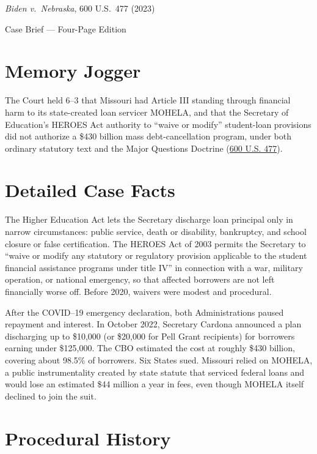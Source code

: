 \documentclass[12pt]{article}
\begin{document}
\begin{center}
{\LARGE \textit{Biden v.\ Nebraska}, 600 U.S.\ 477 (2023)\par}
\vspace{0.8em}
{\large Case Brief --- Four-Page Edition\par}
\end{center}
\vspace{1em}

\section{Memory Jogger}

The Court held 6--3 that Missouri had Article III standing through financial harm to its state-created loan servicer MOHELA, and that the Secretary of Education's HEROES Act authority to ``waive or modify'' student-loan provisions did not authorize a \$430 billion mass debt-cancellation program, under both ordinary statutory text and the Major Questions Doctrine (\href{https://www.law.cornell.edu/supremecourt/text/22-506}{600 U.S. 477}).

\section{Detailed Case Facts}

The Higher Education Act lets the Secretary discharge loan principal only in narrow circumstances: public service, death or disability, bankruptcy, and school closure or false certification. The HEROES Act of 2003 permits the Secretary to ``waive or modify any statutory or regulatory provision applicable to the student financial assistance programs under title IV'' in connection with a war, military operation, or national emergency, so that affected borrowers are not left financially worse off. Before 2020, waivers were modest and procedural.

After the COVID--19 emergency declaration, both Administrations paused repayment and interest. In October 2022, Secretary Cardona announced a plan discharging up to \$10,000 (or \$20,000 for Pell Grant recipients) for borrowers earning under \$125,000. The CBO estimated the cost at roughly \$430 billion, covering about 98.5\% of borrowers. Six States sued. Missouri relied on MOHELA, a public instrumentality created by state statute that serviced federal loans and would lose an estimated \$44 million a year in fees, even though MOHELA itself declined to join the suit.

\section{Procedural History}
\end{document}
